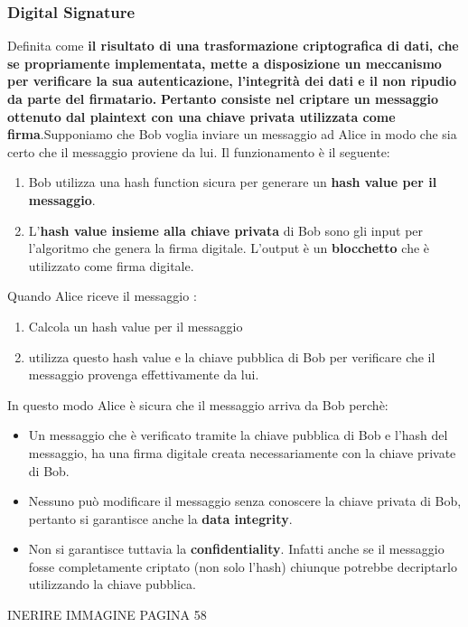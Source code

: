 \documentclass[12pt]{article}
\begin{document}
		\subsubsection{Digital Signature}
			Definita come \textbf{il risultato di una trasformazione criptografica di dati, che se propriamente implementata, mette a disposizione un meccanismo per verificare la sua autenticazione, l'integrità dei dati e il non ripudio da parte del firmatario.} \textbf{Pertanto consiste nel criptare un messaggio ottenuto dal plaintext con una chiave privata utilizzata come firma}.Supponiamo che Bob voglia inviare un messaggio ad Alice in modo che sia certo che il messaggio proviene da lui. Il funzionamento è il seguente:
			\begin{enumerate}
				\item Bob utilizza una hash function sicura per generare un \textbf{hash value per il messaggio}.
				\item L'\textbf{hash value insieme alla chiave privata} di Bob sono gli input per l'algoritmo che genera la firma digitale. L'output è un \textbf{blocchetto} che è utilizzato come firma digitale.
			\end{enumerate}
			Quando Alice riceve il messaggio :
			\begin{enumerate}
				\item Calcola un hash value per il messaggio
				\item utilizza questo hash value e la chiave pubblica di Bob per verificare che il messaggio provenga effettivamente da lui.
			\end{enumerate}
			In questo modo Alice è sicura che il messaggio arriva da Bob perchè:
			\begin{itemize}
				\item Un messaggio che è verificato tramite la chiave pubblica di Bob e l'hash del messaggio, ha una firma digitale creata necessariamente con la chiave private di Bob.
				\item Nessuno può modificare il messaggio senza conoscere la chiave privata di Bob, pertanto si garantisce anche la \textbf{data integrity}.
				\item Non si garantisce tuttavia la \textbf{confidentiality}. Infatti anche se il messaggio fosse completamente criptato (non solo l'hash) chiunque potrebbe decriptarlo utilizzando la chiave pubblica.
			\end{itemize}
			INERIRE IMMAGINE PAGINA 58\\
\end{document}

